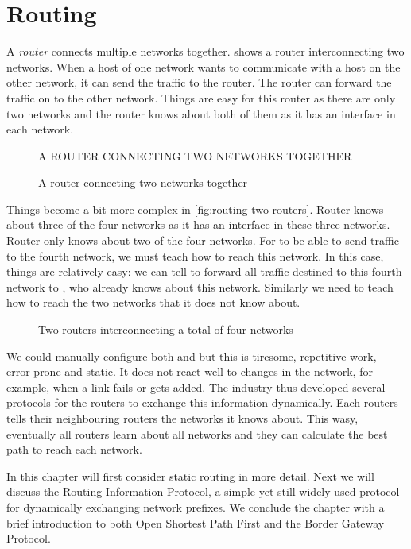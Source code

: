 \chapter{Routing}
\label{sec:routing}

A \emph{router} connects multiple networks together.
 shows a router in\-ter\-con\-nect\-ing two networks.
When a host of one network wants to communicate with a host on the other network, it can send the traffic to the router.
The router can forward the traffic on to the other network.
Things are easy for this router as there are only two networks and the router knows about both of them as it has an interface in each network.


\begin{figure}
   \centering
   A ROUTER CONNECTING TWO NETWORKS TOGETHER
   \caption{A router connecting two networks together}
   \label{fig:routing-basic}
\end{figure}

Things become a bit more complex in \vref{fig:routing-two-routers}.
Router  knows about three of the four networks as it has an interface in these three networks.
Router  only knows about two of the four networks.
For  to be able to send traffic to the fourth network, we must teach  how to reach this network.
In this case, things are relatively easy: we can tell  to forward all traffic destined to this fourth network to , who already knows about this network.
Similarly we need to teach  how to reach the two networks that it does not know about.


\begin{figure}
   \centering
   \caption{Two routers interconnecting a total of four networks}
   \label{fig:routing-two-routers}
\end{figure}


We could manually configure both  and  but this is tiresome, repetitive work, error-prone and static.
It does not react well to changes in the network, for example, when a link fails or gets added.
The industry thus developed several protocols for the routers to exchange this information dynamically.
Each routers tells their neighbouring routers the networks it knows about.
This wasy, eventually all routers learn about all networks and they can calculate the best path to reach each network.

In this chapter will first consider static routing in more detail.
Next we will discuss the Routing Information Protocol, a simple yet still widely used protocol for dynamically exchanging network prefixes.
We conclude the chapter with a brief introduction to both Open Shortest Path First and the Border Gateway Protocol.



